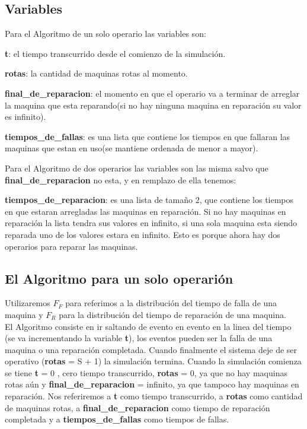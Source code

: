\documentclass[12pt]{article}
\begin{document}
\subsection{Variables}

\noindent Para el Algoritmo de un solo operario las variables son:

\begin{description}
\item{\bf t}: el tiempo transcurrido desde el comienzo de la simulación.
\item{\bf rotas}: la cantidad de maquinas rotas al momento.
\item {\bf final\_de\_reparacion}: el momento en que el operario va a terminar de arreglar la maquina que esta reparando(si no hay ninguna maquina en reparación su valor es infinito).
\item {\bf tiempos\_de\_fallas}: es una lista que contiene los tiempos en que fallaran las maquinas que estan en uso(se mantiene ordenada de menor a mayor).
\end{description}

\noindent Para el Algoritmo de dos operarios las  variables son las misma salvo que {\bf final\_de\_reparacion}  no esta, y en remplazo de ella tenemos:

\begin{description}
\item {\bf tiempos\_de\_reparacion}: es una lista de tamaño $2$, que contiene los tiempos en que estaran arregladas las maquinas en reparación. Si no hay maquinas en reparación la lista tendra sus valores en infinito, si una sola maquina esta siendo reparada uno de los valores estara en infinito. Esto es porque ahora hay dos operarios para reparar las maquinas.
\end{description}


\subsection{El Algoritmo para un solo operarión}
Utilizaremos $F_F$ para referimos a la distribución del tiempo de falla de una maquina y $F_R$ para la distribución del tiempo de reparación de una maquina.\\
\indent El Algoritmo consiste en ir saltando de evento en evento en la linea del tiempo (se va incrementando la variable {\bf t}), 
los eventos pueden ser  la falla de una maquina  o una reparación completada.
Cuando finalmente el sistema deje de ser operativo ({\bf rotas} = S + 1) la simulación termina. 
Cuando la simulación comienza  se tiene  {\bf t} = 0 , cero tiempo transcurrido,  {\bf rotas} = 0, ya que no hay maquinas rotas aún y {\bf final\_de\_reparacion} = infinito, ya que tampoco hay maquinas en reparación. Nos referiremos a {\bf t} como tiempo transcurrido, a {\bf rotas} como cantidad de maquinas rotas, a {\bf final\_de\_reparacion} como tiempo de reparación completada y a  {\bf tiempos\_de\_fallas} como tiempos de fallas.
\end{document}
